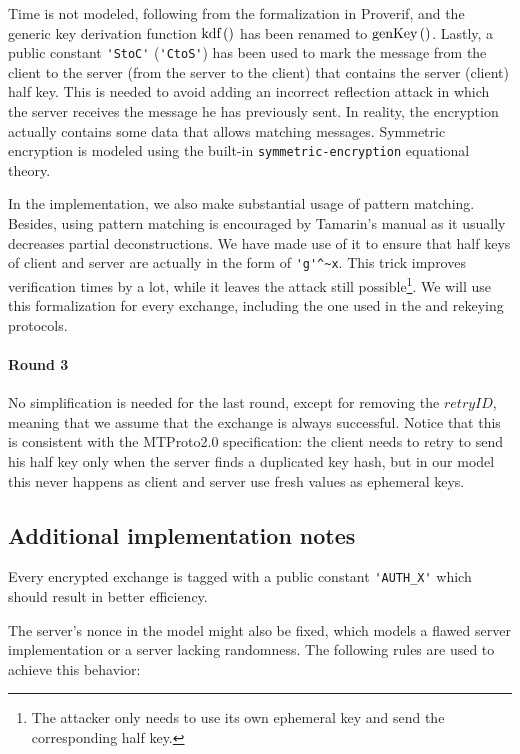Time is not modeled, following from the formalization in Proverif, and the generic key derivation function $\mbox{kdf}\left(\right)$ has been renamed to $\mbox{genKey}\left(\right)$. Lastly, a public constant \lstinline{'StoC'} (\lstinline{'CtoS'}) has been used to mark the message from the client to the server (from the server to the client) that contains the server (client) \DiHe{} half key. This is needed to avoid adding an incorrect reflection attack in which the server receives the message he has previously sent. In reality, the encryption actually contains some data that allows matching messages. Symmetric encryption is modeled using the built-in \lstinline{symmetric-encryption} equational theory.

\lstset{language=tamarin}
In the implementation, we also make substantial usage of pattern matching. Besides, using pattern matching is encouraged by Tamarin's manual as it usually decreases partial deconstructions. We have made use of it to ensure that half keys of client and server are actually in the form of \lstinline{'g'^~x}. This trick improves verification times by a lot, while it leaves the \mitm{} attack still possible\footnote{The attacker only needs to use its own ephemeral key and send the corresponding half key.}. We will use this formalization for every \DiHe{} exchange, including the one used in the \schat{} and rekeying protocols.

\paragraph{Round 3} No simplification is needed for the last round, except for removing the $retryID$, meaning that we assume that the exchange is always successful. Notice that this is consistent with the MTProto2.0 specification: the client needs to retry to send his half key only when the server finds a duplicated key hash, but in our model this never happens as client and server use fresh values as \DiHe{} ephemeral keys.

\subsection{Additional implementation notes}
Every encrypted exchange is tagged with a public constant \lstinline{'AUTH_X'} which should result in better efficiency.

The server's nonce in the model might also be fixed, which models a flawed server implementation or a server lacking randomness. The following rules are used to achieve this behavior:


